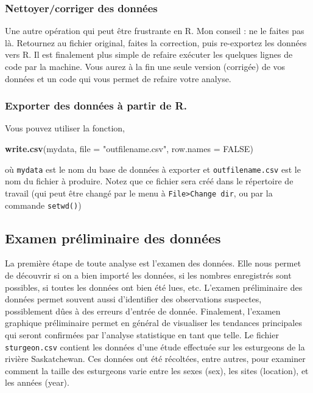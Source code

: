 \documentclass[12pt,]{book}
\newenvironment{Shaded}{\begin{snugshade}}{\end{snugshade}}
\newcommand{\DataTypeTok}[1]{\textcolor[rgb]{0.27,0.27,0.27}{#1}}
\newcommand{\KeywordTok}[1]{\textcolor[rgb]{0.27,0.27,0.27}{\textbf{#1}}}
\newcommand{\NormalTok}[1]{#1}
\newcommand{\OtherTok}[1]{\textcolor[rgb]{0.37,0.37,0.37}{#1}}
\newcommand{\StringTok}[1]{\textcolor[rgb]{0.5,0.5,0.5}{#1}}
\begin{document}
\hypertarget{nettoyercorriger-des-donnuxe9es}{%
\subsubsection{Nettoyer/corriger des données}\label{nettoyercorriger-des-donnuxe9es}}

Une autre opération qui peut être frustrante en R.
Mon conseil : ne le faites pas là.
Retournez au fichier original, faites la correction, puis re-exportez les données vers R.
Il est finalement plus simple de refaire exécuter les quelques lignes de code par la machine.
Vous aurez à la fin une seule version (corrigée) de vos données et un code qui vous permet de refaire votre analyse.

\hypertarget{exporter-des-donnuxe9es-uxe0-partir-de-r.}{%
\subsubsection{Exporter des données à partir de R.}\label{exporter-des-donnuxe9es-uxe0-partir-de-r.}}

Vous pouvez utiliser la fonction,

\begin{Shaded}
\begin{Highlighting}[]
  \KeywordTok{write.csv}\NormalTok{(mydata, }\DataTypeTok{file =} \StringTok{"outfilename.csv"}\NormalTok{, }\DataTypeTok{row.names =} \OtherTok{FALSE}\NormalTok{)}
\end{Highlighting}
\end{Shaded}

où \texttt{mydata} est le nom du base de données à exporter et \texttt{outfilename.csv} est le nom du fichier à produire.
Notez que ce fichier sera créé dans le répertoire de travail (qui peut être changé par le menu à \texttt{File\textgreater{}Change\ dir}, ou par la commande \texttt{setwd()})

\hypertarget{examen-pruxe9liminaire-des-donnuxe9es}{%
\subsection{Examen préliminaire des données}\label{examen-pruxe9liminaire-des-donnuxe9es}}

La première étape de toute analyse est l'examen des données.
Elle nous permet de découvrir si on a bien importé les données, si les nombres enregistrés sont possibles, si toutes les données ont bien été lues, etc.
L'examen préliminaire des données permet souvent aussi d'identifier des observations suspectes, possiblement dûes à des erreurs d'entrée de donnée.
Finalement, l'examen graphique préliminaire permet en général de visualiser les tendances principales qui seront confirmées par l'analyse statistique en tant que telle.
Le fichier \texttt{sturgeon.csv} contient les données d'une étude effectuée sur les esturgeons de la rivière Saskatchewan.
Ces données ont été récoltées, entre autres, pour examiner comment la taille des esturgeons varie entre les sexes (sex), les sites (location), et les années (year).
\end{document}
